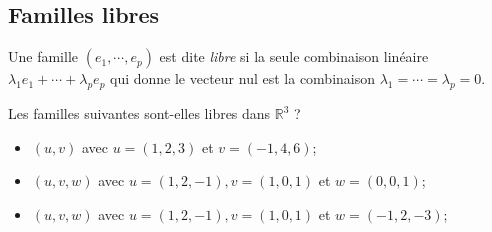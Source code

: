 \vspace{3em}
\subsection*{Familles libres}
Une famille $(e_1, \cdots, e_p)$ est dite \emph{libre} si la seule combinaison linéaire $\lambda_1 e_1 + \cdots + \lambda_p e_p$ qui donne le vecteur nul est la combinaison $\lambda_1 = \cdots = \lambda_p = 0$.

Les familles suivantes sont-elles libres dans $\mathbb{R}^3$ ?
\begin{itemize}
    \item $(u, v)$ avec $u=(1,2,3)$ et $v=(-1,4,6)$;
    \item $(u, v, w)$ avec $u=(1,2,-1), v=(1,0,1)$ et $w=(0,0,1)$;
    \item $(u, v, w)$ avec $u=(1,2,-1), v=(1,0,1)$ et $w=(-1,2,-3)$;
\end{itemize}